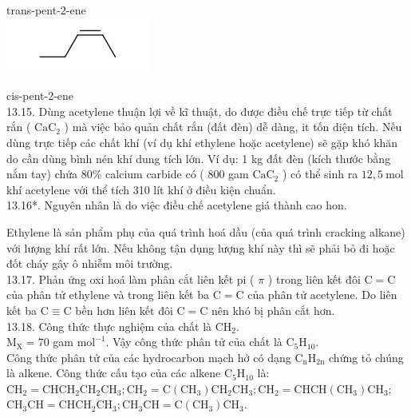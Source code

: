 \documentclass[10pt]{article}
\begin{document}
trans-pent-2-ene\\
\includegraphics{smile-af3f7c560de951f64cdb6e62e88836c48bbb6fef}

cis-pent-2-ene\\
13.15. Dùng acetylene thuận lợi về kĩ thuật, do được điều chế trực tiếp từ chất rắn ( $\mathrm{CaC}_{2}$ ) mà việc bảo quản chất rắn (đất đèn) dễ dàng, it tốn diện tích. Nếu dùng trực tiếp các chất khí (ví dụ khí ethylene hoặc acetylene) sẽ gặp khó khăn do cần dùng bình nén khí dung tích lớn. Ví dụ: 1 kg đất đèn (kích thước bằng nắm tay) chứa $80 \%$ calcium carbide có ( 800 gam $\mathrm{CaC}_{2}$ ) có thể sinh ra $12,5 \mathrm{~mol}$ khí acetylene với thể tích 310 lít khí ở điều kiện chuẩn.\\
13.16*. Nguyên nhân là do việc điều chế acetylene giá thành cao hon.

Ethylene là sản phẩm phụ của quá trình hoá dầu (của quá trình cracking alkane) với lượng khí rất lớn. Nếu không tận dụng lượng khí này thì sẽ phải bỏ đi hoặc đốt cháy gây ô nhiễm môi trường.\\
13.17. Phản ứng oxi hoá làm phân cắt liên kết pi ( $\pi$ ) trong liên kết đôi $\mathrm{C}=\mathrm{C}$ của phân tử ethylene và trong liên kết ba $\mathrm{C}=\mathrm{C}$ của phân tử acetylene. Do liên kết ba $\mathrm{C} \equiv \mathrm{C}$ bền hơn liên kết đôi $\mathrm{C}=\mathrm{C}$ nên khó bị phân cắt hơn.\\
13.18. Công thức thực nghiệm của chất là $\mathrm{CH}_{2}$.\\
$\mathrm{M}_{\mathrm{X}}=70$ gam $\mathrm{mol}^{-1}$. Vậy công thức phân tử của chất là $\mathrm{C}_{5} \mathrm{H}_{10}$.\\
Công thức phân tử của các hydrocarbon mạch hở có dạng $\mathrm{C}_{\mathrm{n}} \mathrm{H}_{2 \mathrm{n}}$ chứng tỏ chúng là alkene. Công thức cấu tạo của các alkene $\mathrm{C}_{5} \mathrm{H}_{10}$ là:\\
$\mathrm{CH}_{2}=\mathrm{CHCH}_{2} \mathrm{CH}_{2} \mathrm{CH}_{3} ; \mathrm{CH}_{2}=\mathrm{C}\left(\mathrm{CH}_{3}\right) \mathrm{CH}_{2} \mathrm{CH}_{3} ; \mathrm{CH}_{2}=\mathrm{CHCH}\left(\mathrm{CH}_{3}\right) \mathrm{CH}_{3} ;$\\
$\mathrm{CH}_{3} \mathrm{CH}=\mathrm{CHCH}_{2} \mathrm{CH}_{3} ; \mathrm{CH}_{3} \mathrm{CH}=\mathrm{C}\left(\mathrm{CH}_{3}\right) \mathrm{CH}_{3}$.
\end{document}
